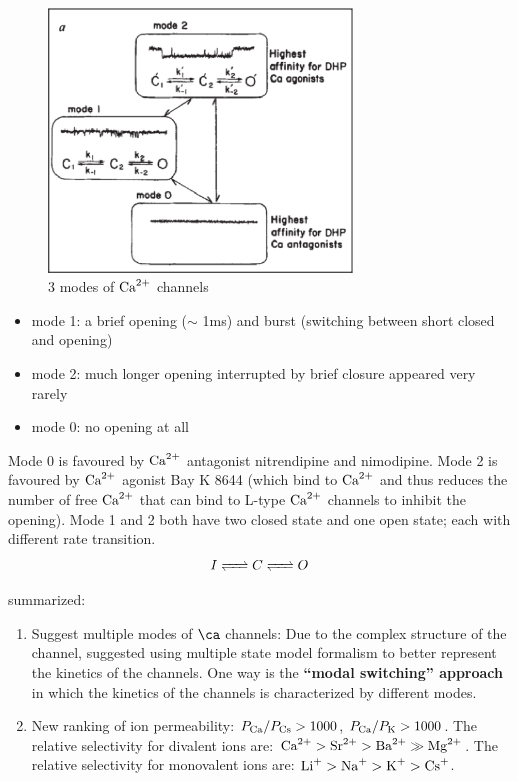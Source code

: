 \begin{figure}[hbt]
 \centerline{\includegraphics[height=7cm, angle=0]{./images/Hess_mode.eps}}
\caption{3 modes of ${\text{Ca}^{2+}}$ channels}
\label{fig:Hess_mode}
\end{figure}

\begin{itemize}
\item mode 1: a brief opening ($\sim$ 1ms) and burst (switching between short
closed and opening)
\item mode 2: much longer opening interrupted by brief closure
  appeared very rarely
\item mode 0: no opening at all
\end{itemize}
Mode 0 is favoured by ${\text{Ca}^{2+}}$ antagonist nitrendipine and
nimodipine. Mode 2 is favoured by ${\text{Ca}^{2+}}$ agonist Bay K 8644 (which bind to ${\text{Ca}^{2+}}$
and thus reduces the number of free ${\text{Ca}^{2+}}$ that can bind to L-type
${\text{Ca}^{2+}}$ channels to inhibit the opening). Mode 1 and 2 both have two closed state
and one open state; each with different rate transition.
\begin{equation}
  \label{eq:989}
  I \ce{<=>} C \ce{<=>} O
\end{equation}

\citep{hess1986ccs} summarized:
\begin{enumerate}
\item Suggest multiple modes of $\ca$ channels: Due to the complex structure of
the channel, \citep{hess1984} suggested using multiple
state model formalism to better represent the kinetics of the channels. One way
is the {\bf ``modal switching'' approach} in which the kinetics of the  channels
is characterized by different modes. 

\item New ranking of ion permeability: $P_{\ce{Ca}}/P_{\ce{Cs}} > 1000$,
$P_{\ce{Ca}}/P_{\ce{K}}>1000$. The  relative selectivity for divalent ions are: $\Ca
> \ce{Sr^2+} >  \ce{Ba^2+} \gg \ce{Mg^2+}$.  The relative selectivity for
monovalent  ions are: $\ce{Li+} > \ce{Na+} > \ce{K+} >
  \ce{Cs+}$. %
\end{enumerate}

